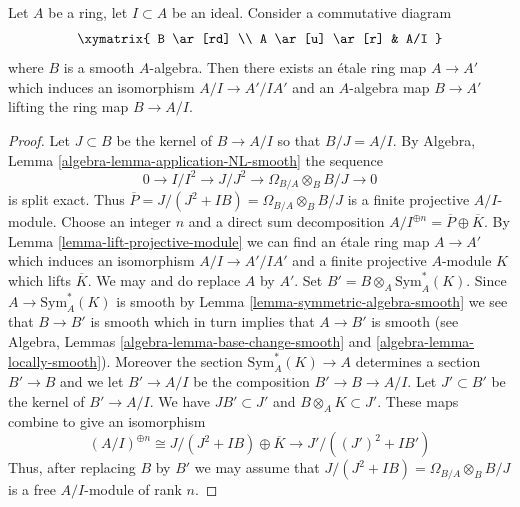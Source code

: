 \begin{lemma}
\label{lemma-lift-section-smooth-morphism}
Let $A$ be a ring, let $I \subset A$ be an ideal. Consider a commutative
diagram
$$
\xymatrix{
B \ar[rd] \\
A \ar[u] \ar[r] & A/I
}
$$
where $B$ is a smooth $A$-algebra. Then there exists an \'etale ring
map $A \to A'$ which induces an isomorphism $A/I \to A'/IA'$ and an
$A$-algebra map $B \to A'$ lifting the ring map $B \to A/I$.
\end{lemma}

\begin{proof}
Let $J \subset B$ be the kernel of $B \to A/I$ so that $B/J = A/I$. By
Algebra, Lemma \ref{algebra-lemma-application-NL-smooth} the sequence
$$
0 \to I/I^2 \to J/J^2 \to \Omega_{B/A} \otimes_B B/J \to 0
$$
is split exact. Thus $\overline{P} = J/(J^2 + IB) = \Omega_{B/A} \otimes_B B/J$
is a finite projective $A/I$-module. Choose an integer $n$ and a direct sum
decomposition $A/I^{\oplus n} = \overline{P} \oplus \overline{K}$.
By Lemma \ref{lemma-lift-projective-module} we can find an
\'etale ring map $A \to A'$ which induces an isomorphism
$A/I \to A'/IA'$ and a finite projective $A$-module $K$ which
lifts $\overline{K}$. We may and do replace $A$ by $A'$.
Set $B' = B \otimes_A \text{Sym}_A^*(K)$. Since $A \to \text{Sym}_A^*(K)$
is smooth by Lemma \ref{lemma-symmetric-algebra-smooth} we see that
$B \to B'$ is smooth which in turn implies that $A \to B'$ is smooth (see
Algebra, Lemmas \ref{algebra-lemma-base-change-smooth} and
\ref{algebra-lemma-locally-smooth}).
Moreover the section $\text{Sym}^*_A(K) \to A$ determines a section
$B' \to B$ and we let $B' \to A/I$ be the composition $B' \to B \to A/I$.
Let $J' \subset B'$ be the kernel of $B' \to A/I$. We have
$JB' \subset J'$ and $B \otimes_A K \subset J'$. These maps combine
to give an isomorphism
$$
(A/I)^{\oplus n} \cong J/(J^2 + IB) \oplus \overline{K}
\longrightarrow
J'/((J')^2 + IB')
$$
Thus, after replacing $B$ by $B'$ we may assume that
$J/(J^2 + IB) = \Omega_{B/A} \otimes_B B/J$ is a free
$A/I$-module of rank $n$.


\end{proof}
